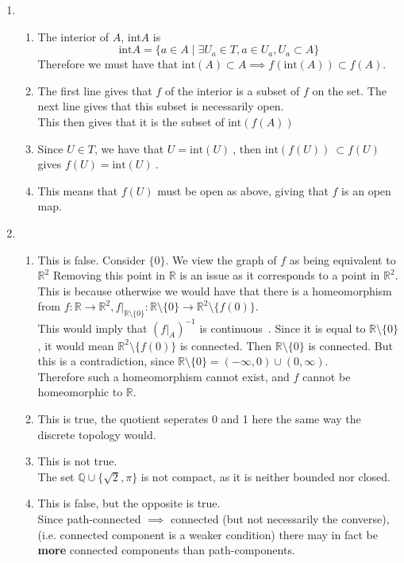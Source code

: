\documentclass{article}
\newcommand{\R}{\mathbb{R}}
\newcommand{\Q}{\mathbb{Q}}
\newcommand{\cts}{continuous\ }
\newcommand{\Int}[1]{\mathrm{int}(#1)\ }
\theoremstyle{remark}
\theoremstyle{example}
\theoremstyle{examples}
\begin{document}
\begin{enumerate}
\begin{enumerate}
	      \end{enumerate}
	\item \begin{enumerate}
		      \item The interior of $A$, int$A$ is \[\mathrm{int}{A}=\{a \in A \mid \exists U_a \in T, a \in U_a, U_a \subset A\}\]
		            Therefore we must have that $\mathrm{int}(A) \subset A \implies f(\mathrm{int}(A)) \subset f(A)$.
		      \item The first line gives that $f$ of the interior is a subset of $f$ on the set. The next line gives that this subset is necessarily open.\\
		            This then gives that it is the subset of $\Int{f(A)}$
		      \item Since $U \in T$, we have that $U=\Int{U}$, then $\Int{f(U)}\subset f(U)$ gives $f(U)=\Int{U}$.
		      \item This means that $f(U)$ must be open as above, giving that $f$ is an open map.
	      \end{enumerate}
	\item \begin{enumerate}
		      \item This is false. Consider $\{0\}$. We view the graph of $f$ as being equivalent to $\R^2$ Removing this point in $\R$ is an issue as it corresponds to a point in $\R^2$. This is because otherwise we would have that there is a homeomorphism from $f: \R \to \R^2, f|_{\R \setminus \{0\}} : \R \setminus \{0\} \to \R^2 \setminus \{f(0)\}$.\\
		            This would imply that $(f|_A)^{-1}$ is \cts. Since it is equal to $\R \setminus \{0\}$, it would mean $\R^2 \setminus\{f(0)\}$ is connected. Then $\R\setminus\{0\}$ is connected. But this is a contradiction, since $\R\setminus\{0\}=(-\infty,0) \cup (0,\infty)$.\\
		            Therefore such a homeomorphism cannot exist, and $f$ cannot be homeomorphic to $\R$.
		      \item This is true, the quotient seperates 0 and 1 here the same way the discrete topology would.
		      \item This is not true.\\
		            The set $\Q \cup \{\sqrt2,\pi\}$ is not compact, as it is neither bounded nor closed.
		      \item This is false, but the opposite is true.\\
		            Since path-connected $\implies$ connected (but not necessarily the converse), (i.e. connected component is a weaker condition) there may in fact be \textbf{more} connected components than path-components.

\end{enumerate}
\end{enumerate}
\end{document}
